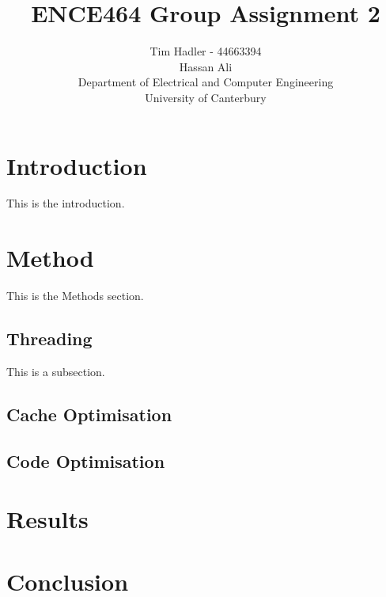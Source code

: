 \documentclass[a4paper, 12pt]{article}
\title{\vspace{-1cm} ENCE464 Group Assignment 2}
\author{Tim Hadler - 44663394 \\ Hassan Ali \\
	\small Department of Electrical and Computer Engineering\\
	\small University of Canterbury}
\begin{document}
\maketitle
\pagebreak
	
\section{Introduction}
	This is the introduction. 


\section{Method}
	This is the Methods section. 

\subsection{Threading}
	This is a subsection. 

\subsection{Cache Optimisation}

\subsection{Code Optimisation}


\section{Results}
	
	
\section{Conclusion}
	
\end{document}
